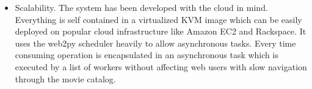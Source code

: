 \begin{itemize}
\item Scalability. The system has been developed with the cloud in mind. Everything is self contained in a virtualized KVM image which can be easily deployed on popular cloud infrastructure like Amazon EC2 and Rackspace. It uses the web2py scheduler heavily to allow asynchronous tasks. Every time consuming operation is encapsulated in an asynchronous task which is executed by a list of workers without affecting web users with slow navigation through the movie catalog. 
\end{itemize}






